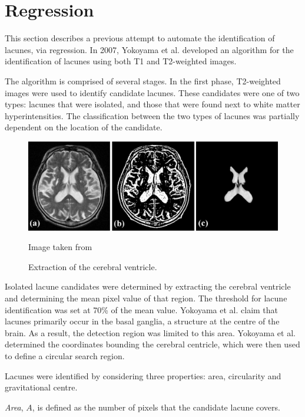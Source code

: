 \section{Regression}\label{litrev-reg}

This section describes a previous attempt to automate the identification of lacunes, via regression. In 2007, Yokoyama et al. \cite{Yokoyama2007} developed an algorithm for the identification of lacunes using both T1 and T2-weighted images.


The algorithm is comprised of several stages. In the first phase, T2-weighted images were used to identify candidate lacunes. These candidates were one of two types: lacunes that were isolated, and those that were found next to white matter hyperintensities. The classification between the two types of lacunes was partially dependent on the location of the candidate.

\begin{figure}[ht]
	\centering
	\includegraphics[width=\textwidth]{Images/4_extract_ventricle.png}
	\caption{Extraction of the cerebral ventricle.}
	\small Image taken from \cite{Yokoyama2007}
\end{figure}

Isolated lacune candidates were determined by extracting the cerebral ventricle and determining the mean pixel value of that region. The threshold for lacune identification was set at 70\% of the mean value. Yokoyama et al. claim that lacunes primarily occur in the basal ganglia, a structure at the centre of the brain. As a result, the detection region was limited to this area. Yokoyama et al. determined the coordinates bounding the cerebral centricle, which were then used to define a circular search region.

Lacunes were identified by considering three properties: area, circularity and gravitational centre.

\textit{Area}, $A$, is defined as the number of pixels that the candidate lacune covers. 

